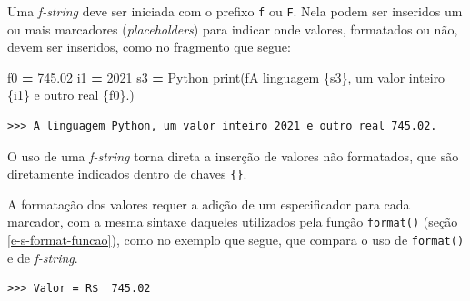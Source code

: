 \documentclass[
]{book}
\newenvironment{Shaded}{\begin{snugshade}}{\end{snugshade}}
\newcommand{\BuiltInTok}[1]{#1}
\newcommand{\DecValTok}[1]{\textcolor[rgb]{0.00,0.00,0.81}{#1}}
\newcommand{\FloatTok}[1]{\textcolor[rgb]{0.00,0.00,0.81}{#1}}
\newcommand{\NormalTok}[1]{#1}
\newcommand{\OperatorTok}[1]{\textcolor[rgb]{0.81,0.36,0.00}{\textbf{#1}}}
\newcommand{\SpecialCharTok}[1]{\textcolor[rgb]{0.00,0.00,0.00}{#1}}
\newcommand{\SpecialStringTok}[1]{\textcolor[rgb]{0.31,0.60,0.02}{#1}}
\newcommand{\StringTok}[1]{\textcolor[rgb]{0.31,0.60,0.02}{#1}}
\begin{document}
Uma \emph{f-string} deve ser iniciada com o prefixo \texttt{f} ou \texttt{F}. Nela podem ser inseridos um ou mais marcadores (\emph{placeholders}) para indicar onde valores, formatados ou não, devem ser inseridos, como no fragmento que segue:

\begin{Shaded}
\begin{Highlighting}[]
\NormalTok{f0 }\OperatorTok{=} \FloatTok{745.02}
\NormalTok{i1 }\OperatorTok{=} \DecValTok{2021}
\NormalTok{s3 }\OperatorTok{=} \StringTok{\textquotesingle{}Python\textquotesingle{}}
\BuiltInTok{print}\NormalTok{(}\SpecialStringTok{f\textquotesingle{}A linguagem }\SpecialCharTok{\{s3\}}\SpecialStringTok{, um valor inteiro }\SpecialCharTok{\{i1\}}\SpecialStringTok{ e outro real }\SpecialCharTok{\{f0\}}\SpecialStringTok{.\textquotesingle{}}\NormalTok{)}
\end{Highlighting}
\end{Shaded}

\begin{verbatim}
>>> A linguagem Python, um valor inteiro 2021 e outro real 745.02.
\end{verbatim}

O uso de uma \emph{f-string} torna direta a inserção de valores não formatados, que são diretamente indicados dentro de chaves \texttt{\{\}}.

A formatação dos valores requer a adição de um especificador para cada marcador, com a mesma sintaxe daqueles utilizados pela função \texttt{format()} (seção \ref{e-s-format-funcao}), como no exemplo que segue, que compara o uso de \texttt{format()} e de \emph{f-string}.

\begin{Shaded}
\end{Shaded}

\begin{verbatim}
>>> Valor = R$  745.02
\end{verbatim}

\begin{Shaded}
\end{Shaded}
\end{document}
